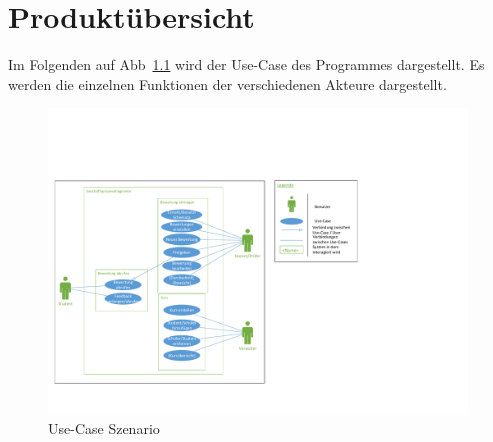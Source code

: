 \chapter{Produktübersicht}
	Im Folgenden auf Abb~\ref{fig:usecase} wird der Use-Case des Programmes dargestellt. Es werden die einzelnen Funktionen der verschiedenen Akteure dargestellt.
	\begin{figure}[H]
		\centering
		\includegraphics[width=0.99\textwidth]{../Diagramme/Use_Case.pdf}
		\caption{Use-Case Szenario}
		\label{fig:usecase}
	\end{figure}
	